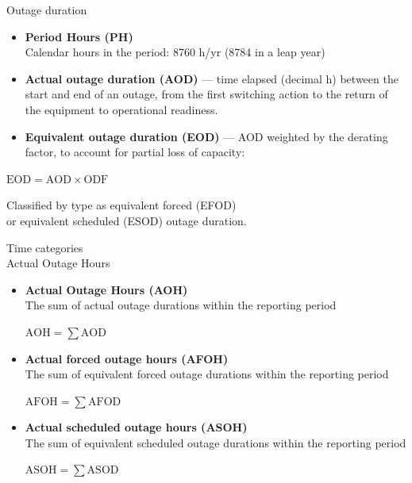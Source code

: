 \begin{frame}{Outage duration}
  \begin{itemize}
    \setlength{\itemsep}{0.6em}
    \item \textbf{Period Hours (PH)}\\Calendar hours in the period: 8760 h/yr (8784 in a leap year)
    \item \textbf{Actual outage duration (AOD)} — time elapsed (decimal h)
          between the start and end of an outage, from the first switching
          action to the return of the equipment to operational readiness.
    \item \textbf{Equivalent outage duration (EOD)} — AOD weighted by the
          derating factor, to account for partial loss of capacity:
  \end{itemize}
  \vspace{0.5em}
  {\centering\large $\displaystyle \mathrm{EOD} = \mathrm{AOD}\times \mathrm{ODF}$ \par}
  \vspace{0.5em}
  \centering
  {\color{atGray}\footnotesize Classified by type as equivalent forced (EFOD)\\ or equivalent scheduled (ESOD) outage duration.}
\end{frame}

\begin{frame}{Time categories\\Actual Outage Hours}
  \begin{itemize}
    \item \textbf{Actual Outage Hours (AOH)} \\
    The sum of actual outage durations within the reporting period

    {\centering $\displaystyle \mathrm{AOH}=\sum \mathrm{AOD}$ \par}

    \item \textbf{Actual forced outage hours (AFOH)} \\
    The sum of equivalent forced outage durations within the reporting period

    {\centering $\displaystyle \mathrm{AFOH}=\sum \mathrm{AFOD}$ \par}

    \item \textbf{Actual scheduled outage hours (ASOH)} \\
    The sum of equivalent scheduled outage durations within the reporting period

    {\centering $\displaystyle \mathrm{ASOH}=\sum \mathrm{ASOD}$ \par}


  \end{itemize}
\end{frame}


